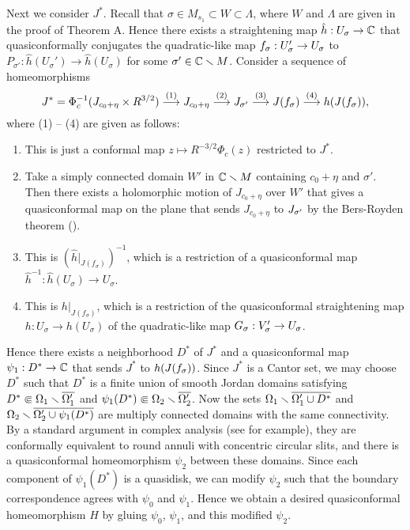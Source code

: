 Next we consider $J^\ast$.
Recall that $\sigma \in M_{s_1} \subset W \subset \Lambda$,
where $W$ and $\Lambda$ are given in the proof of Theorem A.
Hence there exists a straightening map $\hat{h}:U_\sigma \to \mathbb C$ 
that quasiconformally conjugates 
the quadratic-like map $f_{\sigma}:U_\sigma' \to U_\sigma$ 
to $P_{\sigma'}:\hat{h}(U_\sigma') \to \hat{h}(U_\sigma)$ for some 
$\sigma' \in \mathbb C \smallsetminus M$.
Consider a sequence of homeomorphisms
$$
J^\ast=\Phi_{c}^{-1}(J_{c_0 + \eta}\times R^{3/2})
\stackrel{(1)}{\longrightarrow}
J_{c_0+\eta}
\stackrel{(2)}{\longrightarrow}
J_{\sigma'}
\stackrel{(3)}{\longrightarrow}
J(f_{\sigma}) 
\stackrel{(4)}{\longrightarrow}
h(J(f_{\sigma})), 
$$
where (1) -- (4) are given as follows: 
\begin{enumerate}
\item 
This is just a conformal map $z \mapsto R^{-3/2} \Phi_c(z)$
restricted to $J^\ast$.
\item
Take a simply connected domain $W'$ in $\mathbb C \smallsetminus M$ 
containing $c_0+\eta$ and $\sigma'$. 
Then there exists a holomorphic motion of $J_{c_0+\eta}$
over $W'$ that gives a quasiconformal map
on the plane that sends $J_{c_0+\eta}$ to $J_{\sigma'}$
by the Bers-Royden theorem (\cite[Thoerem 1]{Bers-Royden 1986}).
\item
This is $(\hat{h}|_{J(f_\sigma)})^{-1}$, which is a 
restriction of a quasiconformal map 
$\hat{h}^{-1}:\hat{h}(U_\sigma) \to U_\sigma$.
\item
This is $h|_{J(f_\sigma)}$,
which is a restriction of the quasiconformal straightening map 
${h}:U_\sigma \to h(U_\sigma)$ of the quadratic-like map 
$G_\sigma:V_\sigma' \to U_\sigma$.
\end{enumerate}
Hence there exists a neighborhood $D^\ast$ of $J^\ast$
and a quasiconformal map $\psi_1:D^\ast \to \mathbb C$ 
that sends $J^\ast$ to $h(J(f_{\sigma}))$.
Since $J^\ast$ is a Cantor set,
we may choose $D^\ast$ such that $D^\ast$ is a finite union of smooth Jordan domains
satisfying $D^\ast \Subset \Omega_1 \smallsetminus \overline{\Omega_1'}$ and 
$\psi_1(D^\ast) \Subset \Omega_2  \smallsetminus \overline{\Omega_2'}$. 
Now the sets $\Omega_1  \smallsetminus\overline{\Omega_1' \cup D^\ast}$ 
and $\Omega_2  \smallsetminus \overline{\Omega_2'\cup \psi_1(D^\ast)}$
are multiply connected domains with the same connectivity.
By a standard argument in complex analysis
(see \cite[Chapter 6, Theorem 10]{Ahlfors 1978} for example),
they are conformally equivalent to round annuli with 
concentric circular slits, and there is a 
quasiconformal homeomorphism $\psi_2$ between these domains.
Since each component of $\psi_1(D^\ast)$ is a quasidisk,
we can modify $\psi_2$ such that the boundary correspondence 
agrees with $\psi_0$ and $\psi_1$. 
Hence we obtain a desired quasiconformal homeomorphism $H$
by gluing $\psi_0$, $\psi_1$, and this modified $\psi_2$. 

